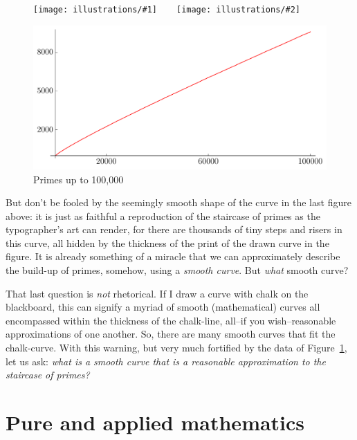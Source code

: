 \documentclass[11pt]{article}
\newcommand{\illtwo}[4]{ 
   \begin{figure}[H]
   \begin{center}
   \texttt{[image: illustrations/\#1]}$\qquad$\texttt{[image: illustrations/\#2]}
   \caption{#4}
    \end{center}
    \end{figure}
}
\theoremstyle{plain}
\theoremstyle{definition}
\numberwithin{equation}{section}
\numberwithin{figure}{section}
\numberwithin{table}{section}
\begin{document}
\illtwo{PN_1000}{PN_10000}{.33}{}

   \begin{figure}[H]
   \begin{center}
   \includegraphics[width=.7\textwidth]{illustrations/PN_100000}
   \caption{Primes up to 100,000\label{fig:pn100000}}
   \end{center}
    \end{figure}

But don't be fooled by the seemingly smooth shape of the curve in the
last figure above: it is just as faithful a reproduction of the
staircase of primes as the typographer's art can render, for there are
thousands of tiny steps and risers in this curve, all hidden by the
thickness of the print of the drawn curve in the figure.  It is
already something of a miracle that we can approximately describe the
build-up of primes, somehow, using a {\em smooth curve}.  But {\em
  what} smooth curve?


That last question is {\em not} rhetorical. If I draw a curve with
chalk on the blackboard, this can signify a myriad of smooth
(mathematical) curves all encompassed within the thickness of the
chalk-line, all--if you wish--reasonable approximations of one
another. So, there are many smooth curves that fit the chalk-curve.
With this warning, but very much fortified by the data of Figure~\ref{fig:pn100000},
let us ask: {\em what is a smooth curve that is a reasonable
  approximation to the staircase of primes?}

\section{ Pure and applied  mathematics  }     
\end{document}

